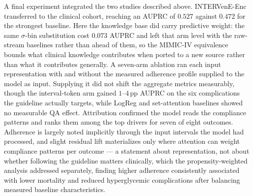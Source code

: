 A final experiment integrated the two studies described above. INTERVenE-Enc transferred to the clinical cohort, reaching an AUPRC of $0.527$ against $0.472$ for the strongest baseline. Here the knowledge base did carry predictive weight: the same $\sigma$-bin substitution cost $0.073$ AUPRC and left that arm level with the raw-stream baselines rather than ahead of them, so the MIMIC-IV equivalence bounds what clinical knowledge contributes when ported to a new source rather than what it contributes generally. A seven-arm ablation ran each input representation with and without the measured adherence profile supplied to the model as input. Supplying it did not shift the aggregate metrics measurably, though the interval-token arm gained $1$--$4$\,pp AUPRC on the six complications the guideline actually targets, while LogReg and set-attention baselines showed no measurable QA effect. Attribution confirmed the model reads the compliance patterns and ranks them among the top drivers for seven of eight outcomes. Adherence is largely noted implicitly through the input intervals the model had processed, and slight residual lift materializes only where attention can weight compliance patterns per outcome --- a statement about representation, not about whether following the guideline matters clinically, which the propensity-weighted analysis addressed separately, finding higher adherence consistently associated with lower mortality and reduced hyperglycemic complications after balancing measured baseline characteristics.

\endgroup
